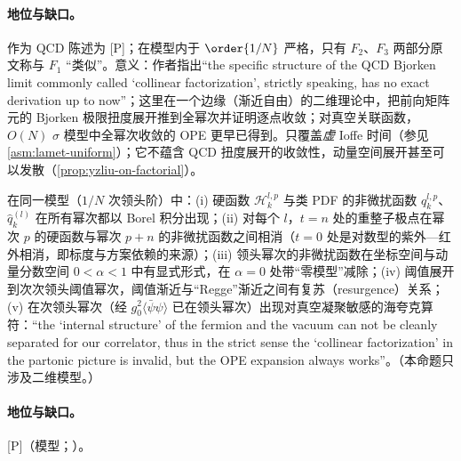 \paragraph{地位与缺口。}作为 QCD 陈述为 [P]；在模型内于 $\order{1/N}$ 严格，只有 $F_2$、$F_3$ 两部分原文称与 $F_1$ “类似”。意义：作者指出“the specific structure of the QCD Bjorken limit commonly called `collinear factorization', strictly speaking, has no exact derivation up to now”\cite[第~1~节]{Liu:2024omb}；这里在一个边缘（渐近自由）的二维理论中，把前向矩阵元的 Bjorken 极限扭度展开推到全幂次并证明逐点收敛；对真空关联函数，$O(N)$ $\sigma$ 模型中全幂次收敛的 OPE 更早已得到\cite{Beneke:1998eq}。只覆盖\emph{虚} Ioffe 时间（参见\cref{asm:lamet-uniform}）；它不蕴含 QCD 扭度展开的收敛性，动量空间展开甚至可以发散（\cref{prop:yzliu-on-factorial}）。

\begin{proposition}\label{prop:yzliu-gn-structure}
在同一模型（$1/N$ 次领头阶）中：(i) 硬函数 $\mathcal H^{l,p}_k$ 与类 PDF 的非微扰函数 $q^{l,p}_k$、$\hat q^{(l)}_k$ 在所有幂次都以 Borel 积分出现；(ii) 对每个 $l$，$t=n$ 处的重整子极点在幂次 $p$ 的硬函数与幂次 $p+n$ 的非微扰函数之间相消（$t=0$ 处是对数型的紫外—红外相消，即标度与方案依赖的来源）；(iii) 领头幂次的非微扰函数在坐标空间与动量分数空间 $0<\alpha<1$ 中有显式形式，在 $\alpha=0$ 处带“零模型”减除；(iv) 阈值展开到次次领头阈值幂次，阈值渐近与“Regge”渐近之间有复苏（resurgence）关系；(v) 在次领头幂次（经 $g_0^2\langle\bar\psi\psi\rangle$ 已在领头幂次）出现对真空凝聚敏感的海夸克算符：“the ‘internal structure’ of the fermion and the vacuum can not be cleanly separated for our correlator, thus in the strict sense the ‘collinear factorization’ in the partonic picture is invalid, but the OPE expansion always works”\cite[第~2.4~节]{Liu:2024omb}。（本命题只涉及二维模型。）
\end{proposition}

\paragraph{地位与缺口。}[P]（模型；\cite[第~1--2.1、4、7~节]{Liu:2024omb}）。

